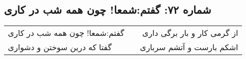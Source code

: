 \begin{center}
\section*{شماره ۷۲: گفتم:‌شمعا! چون همه شب در کاری}
\label{sec:072}
\begin{longtable}{l p{0.5cm} r}
گفتم:‌شمعا! چون همه شب در کاری
&&
از گرمی کار و بار برگی داری
\\
گفتا که درین سوختن و دشواری
&&
اشکم بارست و آتشم سرباری
\\
\end{longtable}
\end{center}
